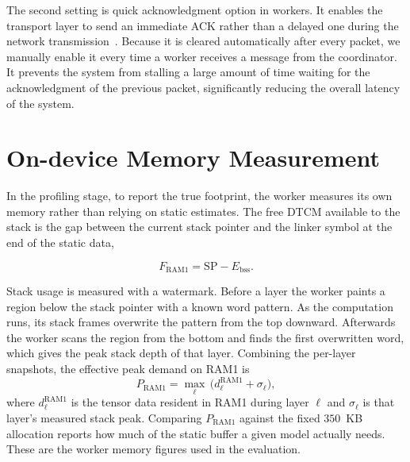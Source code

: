 The second setting is quick acknowledgment option in workers.
It enables the transport layer to send an immediate ACK rather than a delayed one during the network transmission~\cite{linux_tcp}.
Because it is cleared automatically after every packet, we manually enable it every time a worker receives a message from the coordinator. It prevents the system from stalling a large amount of time waiting for the acknowledgment of the previous packet, significantly reducing the overall latency of the system.



\section{On-device Memory Measurement}
In the profiling stage, to report the true footprint, the worker measures its own memory rather than relying on static estimates. The free DTCM available to the stack is the gap between the current stack pointer and the linker symbol at the end of the static data,

\begin{equation}
F_{\mathrm{RAM1}} = \mathrm{SP} - E_{\mathrm{bss}}.
\label{eq:impl-freeram}
\end{equation}

Stack usage is measured with a watermark. Before a layer the worker paints a region below the stack pointer with a known word pattern. As the computation runs, its stack frames overwrite the pattern from the top downward. Afterwards the worker scans the region from the bottom and finds the first overwritten word, which gives the peak stack depth of that layer. Combining the per-layer snapshots, the effective peak demand on RAM1 is
%
\begin{equation}
P_{\mathrm{RAM1}} = \max_{\ell}\,\big( d^{\mathrm{RAM1}}_{\ell} + \sigma_{\ell} \big),
\label{eq:impl-peak}
\end{equation}
%
where $d^{\mathrm{RAM1}}_{\ell}$ is the tensor data resident in RAM1 during layer $\ell$ and $\sigma_{\ell}$ is that layer's measured stack peak. Comparing $P_{\mathrm{RAM1}}$ against the fixed $350$~KB allocation reports how much of the static buffer a given model actually needs. These are the worker memory figures used in the evaluation.